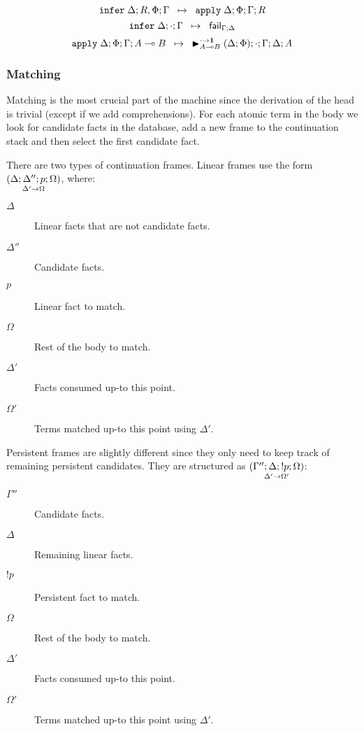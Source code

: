 \[
\trans{\dostate{\Delta}{R, \Phi}{\Gamma}}
   {\appstate{\Delta}{\Phi}{\Gamma}{R}}
\]
\[
\trans{\dostate{\Delta}{\cdot}{\Gamma}}
   {\failstate{\Gamma}{\Delta}}
\]
\[
\trans{\appstate{\Delta}{\Phi}{\Gamma}{A \lolli B}}
      {\matstate{A \lolli B}{(\Delta; \Phi)}{\cdot}{\Gamma}{\Delta}{A}{\cdot \rightarrow
                                                            \one}}
\]

\subsubsection{Matching}

Matching is the most crucial part of the machine since the derivation of the
head is trivial (except if we add comprehensions). For each atomic term in the
body we look for candidate facts in the database, add a new frame to the
continuation stack and then select the first candidate fact.

There are two types of continuation frames. Linear frames use the form
$\lframe{\Delta}{\Delta''}{p}{\Omega}{\Delta'}{\Omega}$, where:

\begin{description}
   \item[$\Delta$] Linear facts that are not candidate facts.
   \item[$\Delta''$] Candidate facts.
   \item[$p$] Linear fact to match.
   \item[$\Omega$] Rest of the body to match.
   \item[$\Delta'$] Facts consumed up-to this point.
   \item[$\Omega'$] Terms matched up-to this point using $\Delta'$.
\end{description}

Persistent frames are slightly different since they only need to keep track of
remaining persistent candidates. They are structured as $\pframe{\Gamma''}{\Delta}{\bang
   p}{\Omega}{\Delta'}{\Omega'}$:

\begin{description}
   \item[$\Gamma''$] Candidate facts.
   \item[$\Delta$] Remaining linear facts.
   \item[$\bang p$] Persistent fact to match.
   \item[$\Omega$] Rest of the body to match.
   \item[$\Delta'$] Facts consumed up-to this point.
   \item[$\Omega'$] Terms matched up-to this point using $\Delta'$.
\end{description}

